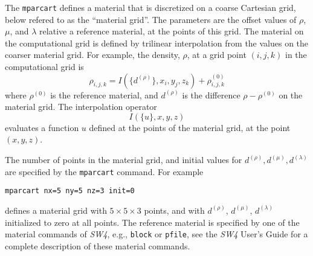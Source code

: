 \documentclass[12pt]{report}
\begin{document}
The \verb+mparcart+ defines a material that is discretized on a coarse Cartesian grid, 
below refered to as the ``material grid''. The parameters are the offset values of 
$\rho$, $\mu$, and $\lambda$ relative a reference material, at the points of this grid. 
The material on the computational grid 
is defined by trilinear interpolation from the values on the coarser material grid. 
For example, the density, $\rho$, at a grid point $(i,j,k)$ in the computational grid is 
$$
  \rho_{i,j,k} = I(\{d^{(\rho)}\},x_i,y_j,z_k) + \rho^{(0)}_{i,j,k}
$$
where $\rho^{(0)}$ is the reference material, and $d^{(\rho)}$ is the difference $\rho-\rho^{(0)}$ 
on the material grid. The interpolation operator
$$
 I(\{ u \}, x,y,z)
$$
evaluates a function $u$ defined at the points of the material grid, at the point $(x,y,z)$.
\par
The number of points in the material grid, and initial values for $d^{(\rho)}, d^{(\mu)}, d^{(\lambda)}$
are specified by the \verb+mparcart+ command. For example
\begin{verbatim}
mparcart nx=5 ny=5 nz=3 init=0
\end{verbatim}
defines a material grid with $5\times 5\times 3$ points, and with $d^{(\rho)}$, $d^{(\mu)}$, $d^{(\lambda)}$
initialized to zero at all points.
The reference material is specified by one of the material commands 
of \emph{SW4}, e.g., \verb+block+ or \verb+pfile+, see the \emph{SW4} User's Guide for a
complete description of these material commands.
\end{document}
